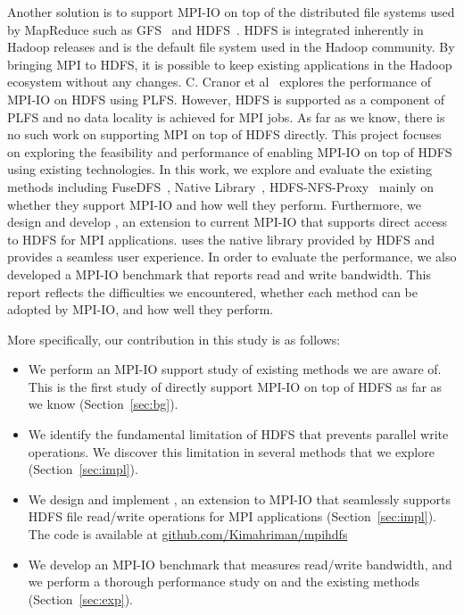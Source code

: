 Another solution is to support MPI-IO on top of the distributed file systems
used by MapReduce such as GFS~\cite{gfs} and HDFS~\cite{hdfs}. HDFS is integrated
inherently in Hadoop releases and is the default file system used in the Hadoop
community. By bringing MPI to HDFS, it is possible to keep existing applications
in the Hadoop ecosystem without any changes. C. Cranor et al~\cite{CMU-PDL-12-115} explores the
performance of MPI-IO on HDFS using PLFS. However, HDFS is supported as a
component of PLFS and no data locality is achieved for MPI jobs. As far as we
know, there is no such work on supporting MPI on top of HDFS directly. This
project focuses on exploring the feasibility and performance of enabling MPI-IO
on top of HDFS using existing technologies. In this work, we explore and evaluate
the existing methods including FuseDFS~\cite{fuse}, Native Library~\cite{lib},
HDFS-NFS-Proxy~\cite{proxy} mainly on whether they support MPI-IO and how
well they perform. Furthermore, we design and develop
{\proj}, an extension to current MPI-IO that supports direct access to HDFS for
MPI applications. {\proj} uses the native library provided by HDFS and provides a
seamless user experience. In order to evaluate the performance, we also
developed a MPI-IO benchmark that reports read and write bandwidth. This report
reflects the difficulties we encountered, whether each method can be adopted by
MPI-IO, and how well they perform. 

More specifically, our contribution in this study is as follows:
\begin{itemize}
\item We perform an MPI-IO support study of existing methods we are aware of. This
	is the first study of directly support MPI-IO on top of HDFS as far as
	we know (Section~\ref{sec:bg}).
\item We identify the fundamental limitation of HDFS that prevents parallel
	write operations. We discover this limitation in several methods that we
	explore (Section~\ref{sec:impl}).
\item We design and implement {\proj}, an extension to MPI-IO that seamlessly
	supports HDFS file read/write operations for MPI applications 
	(Section~\ref{sec:impl}). The code is available at \url{github.com/Kimahriman/mpihdfs}
\item We develop an MPI-IO benchmark that measures read/write bandwidth, and
	we perform a thorough performance study on {\proj} and the existing
	methods (Section~\ref{sec:exp}).
\end{itemize}
